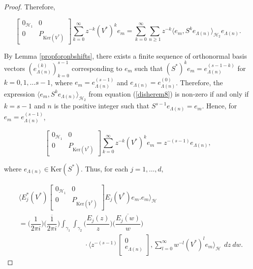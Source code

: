 \documentclass[10pt, reqno]{amsart}
\theoremstyle{definition}
\numberwithin{equation}{section}
\begin{document}
\begin{proof}
\noindent  Therefore,

\begin{equation}\label{disherem8}
\begin{bmatrix}
0_{\mathcal{H}_{1}} & 0\\
0& P_{\mathrm{Ker}(V^{*})}
\end{bmatrix}\sum_{k=0}^{\infty}z^{-k}(V^{*})^{k}e_{m}=\sum_{k=0}^{\infty}  \sum_{n\geq 1} z^{-k}\big\langle e_{m}, S^{k}e_{\Lambda(n)}\big\rangle_{\mathcal{H}_{2}}e_{\Lambda(n)}.
\end{equation}

By Lemma \ref{propforonbshifts}, there exists a finite sequence of orthonormal basis vectors $(e_{\Lambda(n)}^{(k)})_{k=0}^{s-1}$ corresponding to $e_{m}$ such that $(S^{*})^{k}e_{m}=e_{\Lambda(n)}^{(s-1-k)}$ for $k=0,1,\hdots s-1$, where $e_{m}=e_{\Lambda(n)}^{(s-1)}$ and $e_{\Lambda(n)}=e_{\Lambda(n)}^{(0)}$. Therefore, the expression $\big\langle e_{m}, S^{k}e_{\Lambda(n)}\big\rangle_{\mathcal{H}_{2}}$ from equation (\ref{disherem8}) is non-zero if and only if $k=s-1$ and $n$ is the positive integer such that $S^{s-1}e_{\Lambda(n)}=e_{m}$. Hence, for $e_{m}=e_{\Lambda(n)}^{(s-1)}$,

$$\begin{bmatrix}
0_{\mathcal{H}_{1}} & 0\\
0& P_{\mathrm{Ker}(V^{*})}
\end{bmatrix}\sum_{k=0}^{\infty}z^{-k}(V^{*})^{k}e_{m}=z^{-(s-1)}e_{\Lambda(n)},$$

\noindent where $e_{\Lambda(n)}\in\mathrm{Ker}(S^{*})$. Thus, for each $j=1,\hdots,d$,

\begin{align}
&\bigg\langle E^{*}_{j}(V^{*})\begin{bmatrix}
0_{\mathcal{H}_{1}} & 0\\
0& P_{\mathrm{Ker}(V^{*})}
\end{bmatrix}E_{j}(V^{*})e_{m}.e_{m}\bigg\rangle_{\mathcal{H}}\nonumber\\
&=\Big(\dfrac{1}{2\pi i}\Big)\overline{\Big(\dfrac{1}{2\pi i}\Big)}\int_{\gamma_{1}}\int_{\gamma_{2}}\bigg(\dfrac{E_{j}(z)}{z}\bigg)\bigg(\overline{\dfrac{E_{j}(w)}{w}}\bigg)\nonumber\\
&\hspace{4cm}\cdot\bigg\langle z^{-(s-1)}\begin{bmatrix}
0\\
e_{\Lambda(n)}\end{bmatrix},
\sum_{l=0}^{\infty}w^{-l}(V^{*})^{l}e_{m}\bigg\rangle_{\mathcal{H}}~~dz~dw.\label{hello}
\end{align}


\end{proof}
\end{document}
